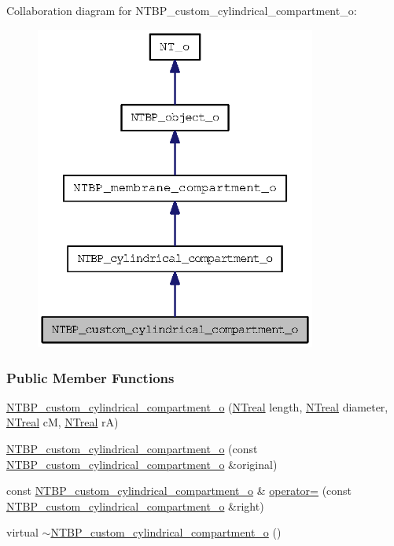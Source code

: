 Collaboration diagram for NTBP\_\-custom\_\-cylindrical\_\-compartment\_\-o:
\nopagebreak
\begin{figure}[H]
\begin{center}
\leavevmode
\includegraphics[width=262pt]{class_n_t_b_p__custom__cylindrical__compartment__o__coll__graph}
\end{center}
\end{figure}
\subsubsection*{Public Member Functions}
\begin{DoxyCompactItemize}
\item 
\hyperlink{class_n_t_b_p__custom__cylindrical__compartment__o_aee66eef70feb1e8fee38b2ce5a0cd62e}{NTBP\_\-custom\_\-cylindrical\_\-compartment\_\-o} (\hyperlink{nt__types_8h_a814a97893e9deb1eedcc7604529ba80d}{NTreal} length, \hyperlink{nt__types_8h_a814a97893e9deb1eedcc7604529ba80d}{NTreal} diameter, \hyperlink{nt__types_8h_a814a97893e9deb1eedcc7604529ba80d}{NTreal} cM, \hyperlink{nt__types_8h_a814a97893e9deb1eedcc7604529ba80d}{NTreal} rA)
\item 
\hyperlink{class_n_t_b_p__custom__cylindrical__compartment__o_a4ddca271d0d27359315a24b323424cdb}{NTBP\_\-custom\_\-cylindrical\_\-compartment\_\-o} (const \hyperlink{class_n_t_b_p__custom__cylindrical__compartment__o}{NTBP\_\-custom\_\-cylindrical\_\-compartment\_\-o} \&original)
\item 
const \hyperlink{class_n_t_b_p__custom__cylindrical__compartment__o}{NTBP\_\-custom\_\-cylindrical\_\-compartment\_\-o} \& \hyperlink{class_n_t_b_p__custom__cylindrical__compartment__o_a592220f2be4bf48a50ed0d9e722257bb}{operator=} (const \hyperlink{class_n_t_b_p__custom__cylindrical__compartment__o}{NTBP\_\-custom\_\-cylindrical\_\-compartment\_\-o} \&right)
\item 
virtual \hyperlink{class_n_t_b_p__custom__cylindrical__compartment__o_acf2de8f21289780656265766b6b22e22}{$\sim$NTBP\_\-custom\_\-cylindrical\_\-compartment\_\-o} ()
\end{DoxyCompactItemize}


